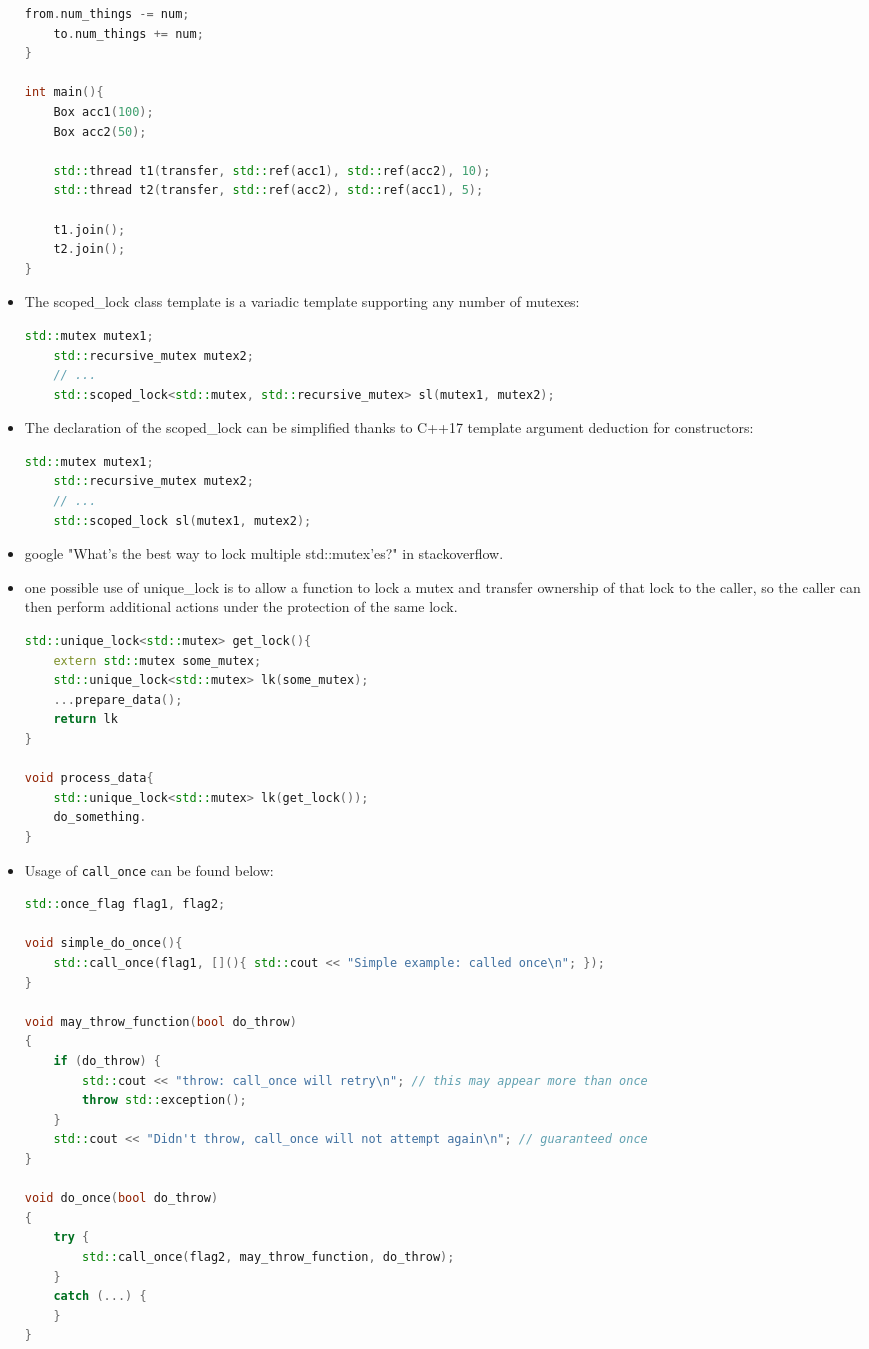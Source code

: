 \documentclass[a4paper,11pt,twoside]{book}
\begin{document}
\begin{itemize}
\begin{lstlisting}[frame=single, language=c++]
	from.num_things -= num;
	to.num_things += num;
}

int main(){
	Box acc1(100);
	Box acc2(50);
	
	std::thread t1(transfer, std::ref(acc1), std::ref(acc2), 10);
	std::thread t2(transfer, std::ref(acc2), std::ref(acc1), 5);
	
	t1.join();
	t2.join();
}
\end{lstlisting}			
	
	\item The scoped\_lock class template is a variadic template supporting any number of mutexes:
\begin{lstlisting}[frame=single, language=c++]	
	std::mutex mutex1;
	std::recursive_mutex mutex2;
	// ...
	std::scoped_lock<std::mutex, std::recursive_mutex> sl(mutex1, mutex2);
\end{lstlisting}	
	
	\item The declaration of the scoped\_lock can be simplified thanks to C++17 template argument deduction for constructors:
	
\begin{lstlisting}[frame=single, language=c++]	
	std::mutex mutex1;
	std::recursive_mutex mutex2;
	// ...
	std::scoped_lock sl(mutex1, mutex2);
\end{lstlisting}

\item google "What's the best way to lock multiple std::mutex'es?" in stackoverflow. 

\item one possible use of unique\_lock is to allow a function to lock a mutex and transfer ownership of that lock to the caller, so the caller can then perform additional actions under the protection of the same lock. 

\begin{lstlisting}[frame=single, language=c++]	
std::unique_lock<std::mutex> get_lock(){
	extern std::mutex some_mutex;
	std::unique_lock<std::mutex> lk(some_mutex);
	...prepare_data();
	return lk
}

void process_data{
	std::unique_lock<std::mutex> lk(get_lock());
	do_something.
}
\end{lstlisting}

\item Usage of \texttt{call\_once} can be found below:
\begin{lstlisting}[frame=single, language=c++]	
std::once_flag flag1, flag2;

void simple_do_once(){
	std::call_once(flag1, [](){ std::cout << "Simple example: called once\n"; });
}

void may_throw_function(bool do_throw)
{
	if (do_throw) {
		std::cout << "throw: call_once will retry\n"; // this may appear more than once
		throw std::exception();
	}
	std::cout << "Didn't throw, call_once will not attempt again\n"; // guaranteed once
}

void do_once(bool do_throw)
{
	try {
		std::call_once(flag2, may_throw_function, do_throw);
	}
	catch (...) {
	}
}	
\end{lstlisting}
\end{itemize}
\end{document}
